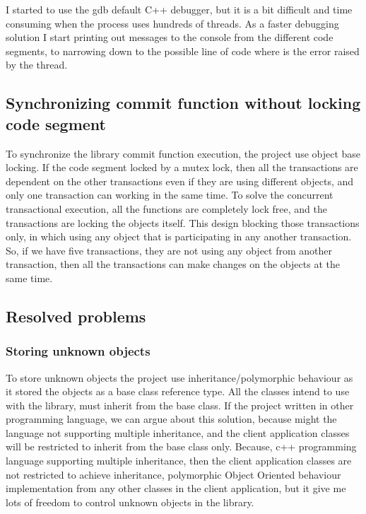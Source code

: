 \documentclass[12pt]{article}
\begin{document}
I started to use the gdb default C++ debugger, but it is a bit difficult and time consuming when the process uses hundreds of threads. As a faster debugging solution I start printing out messages to the console from the different code segments, to narrowing down to the possible line of code where is the error raised by the thread.    

\subsection{Synchronizing commit function without locking code segment }
To synchronize the library commit function execution, the project use object base locking. If the code segment locked by a mutex lock, then all the transactions are dependent on the other transactions even if they are using different objects, and only one transaction can working in the same time. To solve the concurrent transactional execution, all the functions are completely lock free, and the transactions are locking the objects itself. This design blocking those transactions only, in which using any object that is participating in any another transaction. So, if we have five transactions, they are not using any object from another transaction, then all the transactions can make changes on the objects at the same time. 


\subsection{Resolved problems }

\subsubsection{Storing unknown objects }
To store unknown objects the project use inheritance/polymorphic behaviour as it stored the objects as a base class reference type. All the classes intend to use with the library, must inherit from the base class. If the project written in other programming language, we can argue about this solution, because might the language not supporting multiple inheritance, and the client application classes will be restricted to inherit from the base class only. Because, c++ programming language supporting multiple inheritance, then the client application classes are not restricted to achieve inheritance, polymorphic Object Oriented behaviour implementation from any other classes in the client application, but it give me lots of freedom to control unknown objects in the library.
\end{document}

